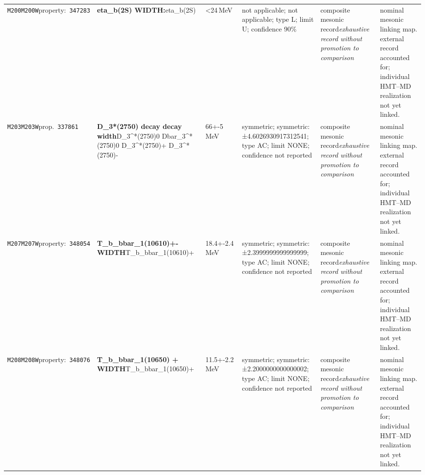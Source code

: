 \begin{landscape}
\begin{longtable}{L{1.85cm}L{4.45cm}L{2.35cm}L{4.05cm}L{3.35cm}L{7.15cm}}
\texttt{M200}\newline \texttt{M200W}\newline property:\ \texttt{347283} & \textbf{eta\_\allowbreak{}b(2S) WIDTH:}\newline eta\_\allowbreak{}b(2S) & \textless{}24\,MeV & not applicable; not applicable; type L; limit U; confidence 90\% & composite mesonic record\newline \emph{exhaustive record without promotion to comparison} & nominal mesonic linking map. external record accounted for; individual HMT--MD realization not yet linked. \\
\texttt{M203}\newline \texttt{M203W}\newline prop.\ \texttt{337861} & \textbf{D\_\allowbreak{}3*(2750) decay decay width}\newline D\_\allowbreak{}3\textasciicircum{}*(2750)0 \textbar{}\allowbreak{} Dbar\_\allowbreak{}3\textasciicircum{}*(2750)0 \textbar{}\allowbreak{} D\_\allowbreak{}3\textasciicircum{}*(2750)+ \textbar{}\allowbreak{} D\_\allowbreak{}3\textasciicircum{}*(2750)- & 66+-5\,MeV & symmetric; symmetric: ±4.6026930917312541; type AC; limit NONE; confidence not reported & composite mesonic record\newline \emph{exhaustive record without promotion to comparison} & nominal mesonic linking map. external record accounted for; individual HMT--MD realization not yet linked. \\
\texttt{M207}\newline \texttt{M207W}\newline property:\ \texttt{348054} & \textbf{T\_\allowbreak{}b\_\allowbreak{}bbar\_\allowbreak{}1(10610)+- WIDTH}\newline T\_\allowbreak{}b\_\allowbreak{}bbar\_\allowbreak{}1(10610)+ & 18.4+-2.4\,MeV & symmetric; symmetric: ±2.3999999999999999; type AC; limit NONE; confidence not reported & composite mesonic record\newline \emph{exhaustive record without promotion to comparison} & nominal mesonic linking map. external record accounted for; individual HMT--MD realization not yet linked. \\
\texttt{M208}\newline \texttt{M208W}\newline property:\ \texttt{348076} & \textbf{T\_\allowbreak{}b\_\allowbreak{}bbar\_\allowbreak{}1(10650) + WIDTH}\newline T\_\allowbreak{}b\_\allowbreak{}bbar\_\allowbreak{}1(10650)+ & 11.5+-2.2\,MeV & symmetric; symmetric: ±2.2000000000000002; type AC; limit NONE; confidence not reported & composite mesonic record\newline \emph{exhaustive record without promotion to comparison} & nominal mesonic linking map. external record accounted for; individual HMT--MD realization not yet linked. \\

\end{longtable}
\end{landscape}
